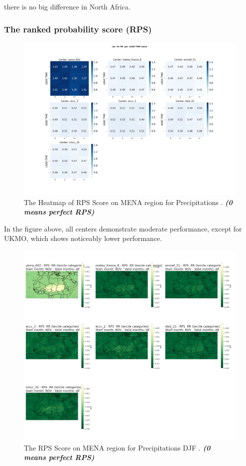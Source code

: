 there is no big difference in North Africa.


\subsubsection{The ranked probability score (RPS)}


\begin{figure}[H]
    \centering
    \includegraphics[scale=0.25]{plots/prob/rps/rps_RR_mena.png}
    \caption{The Heatmap of  RPS Score on MENA region for Precipitations    . \textbf{\textit{(0 means perfect RPS)}}}
\end{figure}

In the figure above, all centers demonstrate moderate performance, except for UKMO, which shows noticeably lower performance. 


\begin{figure}[H]
    \centering
    \includegraphics[scale=0.25]{plots/prob/rps/rps_djf_RR.png}
    \caption{The   RPS Score on MENA region for Precipitations DJF   . \textbf{\textit{(0 means perfect RPS)}}}
\end{figure}

